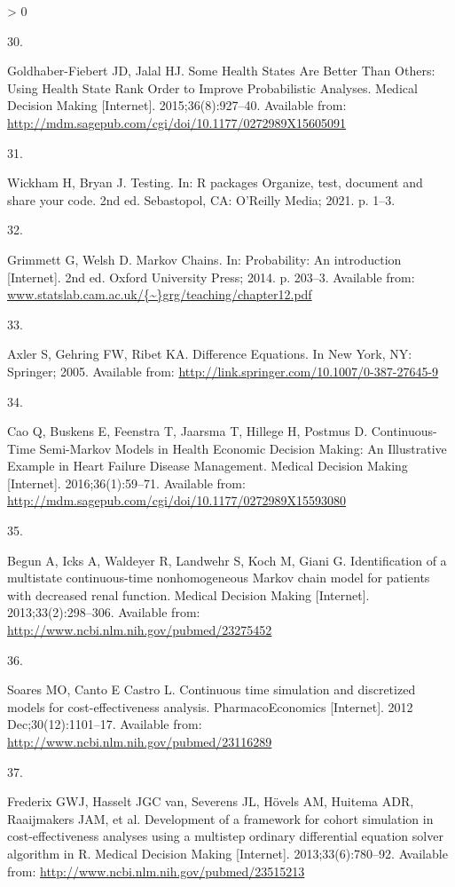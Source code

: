 \documentclass[
]{article}
\newlength{\cslhangindent}
\newlength{\csllabelwidth}
\newenvironment{CSLReferences}[2] %
 {%
  \setlength{\parindent}{0pt}
  \ifodd #1 \everypar{\setlength{\hangindent}{\cslhangindent}}\ignorespaces\fi
  \ifnum #2 > 0
  \setlength{\parskip}{#2\baselineskip}
  \fi
 }%
 {}
\newcommand{\CSLLeftMargin}[1]{\parbox[t]{\csllabelwidth}{#1}}
\newcommand{\CSLRightInline}[1]{\parbox[t]{\linewidth - \csllabelwidth}{#1}\break}
\begin{document}
\begin{CSLReferences}{0}{0}
\leavevmode\hypertarget{ref-Goldhaber-Fiebert2015}{}%
\CSLLeftMargin{30. }
\CSLRightInline{Goldhaber-Fiebert JD, Jalal HJ. {Some Health States Are Better Than Others: Using Health State Rank Order to Improve Probabilistic Analyses}. Medical Decision Making {[}Internet{]}. 2015;36(8):927--40. Available from: \url{http://mdm.sagepub.com/cgi/doi/10.1177/0272989X15605091}}

\leavevmode\hypertarget{ref-Wickham2021}{}%
\CSLLeftMargin{31. }
\CSLRightInline{Wickham H, Bryan J. {Testing}. In: R packages Organize, test, document and share your code. 2nd ed. Sebastopol, CA: O'Reilly Media; 2021. p. 1--3. }

\leavevmode\hypertarget{ref-Grimmett2014}{}%
\CSLLeftMargin{32. }
\CSLRightInline{Grimmett G, Welsh D. {Markov Chains}. In: Probability: An introduction {[}Internet{]}. 2nd ed. Oxford University Press; 2014. p. 203--3. Available from: \href{https://www.statslab.cam.ac.uk/\%7B~\%7Dgrg/teaching/chapter12.pdf}{www.statslab.cam.ac.uk/\{\textasciitilde\}grg/teaching/chapter12.pdf}}

\leavevmode\hypertarget{ref-Axler2005}{}%
\CSLLeftMargin{33. }
\CSLRightInline{Axler S, Gehring FW, Ribet KA. {Difference Equations}. In New York, NY: Springer; 2005. Available from: \url{http://link.springer.com/10.1007/0-387-27645-9}}

\leavevmode\hypertarget{ref-Cao2016}{}%
\CSLLeftMargin{34. }
\CSLRightInline{Cao Q, Buskens E, Feenstra T, Jaarsma T, Hillege H, Postmus D. {Continuous-Time Semi-Markov Models in Health Economic Decision Making: An Illustrative Example in Heart Failure Disease Management}. Medical Decision Making {[}Internet{]}. 2016;36(1):59--71. Available from: \url{http://mdm.sagepub.com/cgi/doi/10.1177/0272989X15593080}}

\leavevmode\hypertarget{ref-Begun2013}{}%
\CSLLeftMargin{35. }
\CSLRightInline{Begun A, Icks A, Waldeyer R, Landwehr S, Koch M, Giani G. {Identification of a multistate continuous-time nonhomogeneous Markov chain model for patients with decreased renal function.} Medical Decision Making {[}Internet{]}. 2013;33(2):298--306. Available from: \url{http://www.ncbi.nlm.nih.gov/pubmed/23275452}}

\leavevmode\hypertarget{ref-Soares2012}{}%
\CSLLeftMargin{36. }
\CSLRightInline{Soares MO, Canto E Castro L. {Continuous time simulation and discretized models for cost-effectiveness analysis}. PharmacoEconomics {[}Internet{]}. 2012 Dec;30(12):1101--17. Available from: \url{http://www.ncbi.nlm.nih.gov/pubmed/23116289}}

\leavevmode\hypertarget{ref-Frederix2013a}{}%
\CSLLeftMargin{37. }
\CSLRightInline{Frederix GWJ, Hasselt JGC van, Severens JL, Hövels AM, Huitema ADR, Raaijmakers JAM, et al. {Development of a framework for cohort simulation in cost-effectiveness analyses using a multistep ordinary differential equation solver algorithm in R.} Medical Decision Making {[}Internet{]}. 2013;33(6):780--92. Available from: \url{http://www.ncbi.nlm.nih.gov/pubmed/23515213}}

\end{CSLReferences}
\end{document}
